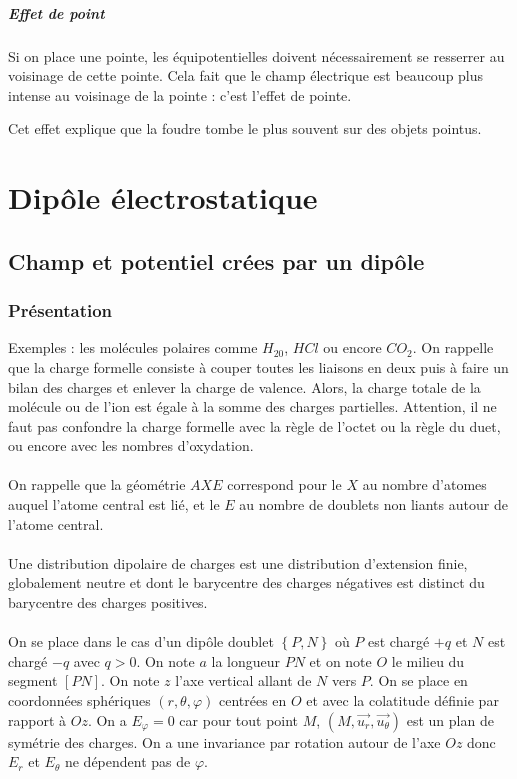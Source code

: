 \documentclass[french]{book}
\theoremstyle{plain}
\theoremstyle{definition}
\theoremstyle{remark}
\begin{document}
\paragraph{Effet de point} Si on place une pointe, les équipotentielles doivent nécessairement se resserrer au voisinage de cette pointe. Cela fait que le champ électrique est beaucoup plus intense au voisinage de la pointe : c'est l'effet de pointe. \\ \par Cet effet explique que la foudre tombe le plus souvent sur des objets pointus.
\chapter{Dipôle électrostatique}
\localtableofcontents
\section{Champ et potentiel crées par un dipôle}
\subsection{Présentation}
Exemples : les molécules polaires comme $H_20$, $HCl$ ou encore $CO_2$. On rappelle que la charge formelle consiste à couper toutes les liaisons en deux puis à faire un bilan des charges et enlever la charge de valence. Alors, la charge totale de la molécule ou de l'ion est égale à la somme des charges partielles. Attention, il ne faut pas confondre la charge formelle avec la règle de l'octet ou la règle du duet, ou encore avec les nombres d'oxydation. \\ \\
On rappelle que la géométrie $AXE$ correspond pour le $X$ au nombre d'atomes auquel l'atome central est lié, et le $E$ au nombre de doublets non liants autour de l'atome central. \\ \\
Une distribution dipolaire de charges est une distribution d'extension finie, globalement neutre et dont le barycentre des charges négatives est distinct du barycentre des charges positives. \\ \\
On se place dans le cas d'un dipôle doublet $\left\{P,N\right\}$ où $P$ est chargé $+q$ et $N$ est chargé $-q$ avec $q>0$. On note $a$ la longueur $PN$ et on note $O$ le milieu du segment $[PN]$. On note $z$ l'axe vertical allant de $N$ vers $P$. On se place en coordonnées sphériques $(r,\theta,\varphi)$ centrées en $O$ et avec la colatitude définie par rapport à $Oz$. On a $E_\varphi=0$ car pour tout point $M$, $(M,\overrightarrow{u_r},\overrightarrow{u_\theta})$ est un plan de symétrie des charges. On a une invariance par rotation autour de l'axe $Oz$ donc $E_r$ et $E_\theta$ ne dépendent pas de $\varphi$.
\end{document}
